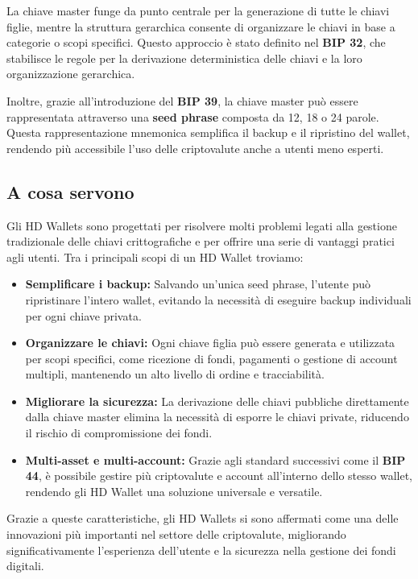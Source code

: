 \documentclass{article}
\begin{document}
La chiave master funge da punto centrale per la generazione di tutte le chiavi figlie, mentre la struttura gerarchica consente di organizzare le chiavi in base a categorie o scopi specifici. Questo approccio è stato definito nel \textbf{BIP 32}, che stabilisce le regole per la derivazione deterministica delle chiavi e la loro organizzazione gerarchica.

Inoltre, grazie all'introduzione del \textbf{BIP 39}, la chiave master può essere rappresentata attraverso una \textbf{seed phrase} composta da 12, 18 o 24 parole. Questa rappresentazione mnemonica semplifica il backup e il ripristino del wallet, rendendo più accessibile l'uso delle criptovalute anche a utenti meno esperti.

\subsection{A cosa servono}
Gli HD Wallets sono progettati per risolvere molti problemi legati alla gestione tradizionale delle chiavi crittografiche e per offrire una serie di vantaggi pratici agli utenti. Tra i principali scopi di un HD Wallet troviamo:
\begin{itemize}
    \item \textbf{Semplificare i backup:} Salvando un'unica seed phrase, l'utente può ripristinare l'intero wallet, evitando la necessità di eseguire backup individuali per ogni chiave privata.\vspace{0.5em}
    \item \textbf{Organizzare le chiavi:} Ogni chiave figlia può essere generata e utilizzata per scopi specifici, come ricezione di fondi, pagamenti o gestione di account multipli, mantenendo un alto livello di ordine e tracciabilità.\vspace{0.5em}
    \item \textbf{Migliorare la sicurezza:} La derivazione delle chiavi pubbliche direttamente dalla chiave master elimina la necessità di esporre le chiavi private, riducendo il rischio di compromissione dei fondi.\vspace{0.5em}
    \item \textbf{Multi-asset e multi-account:} Grazie agli standard successivi come il \textbf{BIP 44}, è possibile gestire più criptovalute e account all'interno dello stesso wallet, rendendo gli HD Wallet una soluzione universale e versatile.
\end{itemize}
Grazie a queste caratteristiche, gli HD Wallets si sono affermati come una delle innovazioni più importanti nel settore delle criptovalute, migliorando significativamente l'esperienza dell'utente e la sicurezza nella gestione dei fondi digitali.
\end{document}
